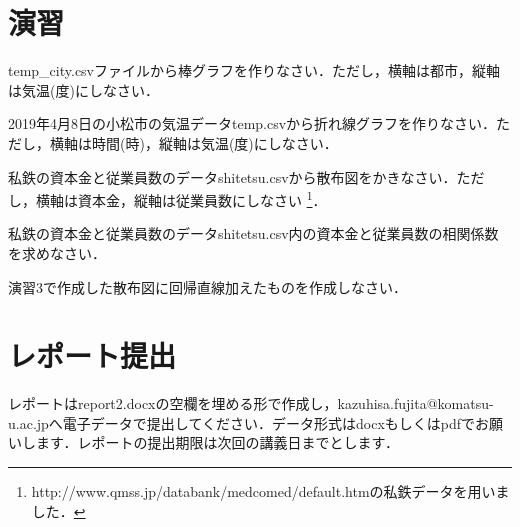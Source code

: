 \section{演習}

\practice
temp\_city.csvファイルから棒グラフを作りなさい．ただし，横軸は都市，縦軸は気温(度)にしなさい．

\practice
2019年4月8日の小松市の気温データtemp.csvから折れ線グラフを作りなさい．ただし，横軸は時間(時)，縦軸は気温(度)にしなさい．

\practice
私鉄の資本金と従業員数のデータshitetsu.csvから散布図をかきなさい．ただし，横軸は資本金，縦軸は従業員数にしなさい
\footnote{http://www.qmss.jp/databank/medcomed/default.htmの私鉄データを用いました．}．

\practice
私鉄の資本金と従業員数のデータshitetsu.csv内の資本金と従業員数の相関係数を求めなさい．

\practice
演習3で作成した散布図に回帰直線加えたものを作成しなさい．

\section{レポート提出}

レポートはreport2.docxの空欄を埋める形で作成し，kazuhisa.fujita@komatsu-u.ac.jpへ電子データで提出してください．データ形式はdocxもしくはpdfでお願いします．レポートの提出期限は次回の講義日までとします．
